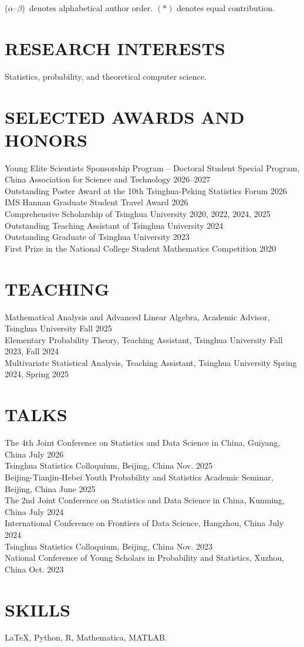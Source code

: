 \documentclass[a4paper,10pt]{extarticle}
\newcommand{\alphaorder}{($\alpha$--$\beta$)}
\begin{document}
\noindent
\alphaorder\ denotes alphabetical author order. $(*)$ denotes equal contribution.

\vfill
\section*{RESEARCH INTERESTS}
Statistics, probability, and theoretical computer science.

\vfill
\section*{SELECTED AWARDS AND HONORS}
Young Elite Scientists Sponsorship Program -- Doctoral Student Special Program,
China Association for Science and Technology \hfill 2026--2027\\
Outstanding Poster Award at the 10th Tsinghua-Peking Statistics Forum \hfill 2026\\
IMS Hannan Graduate Student Travel Award \hfill 2026\\
Comprehensive Scholarship of Tsinghua University \hfill 2020, 2022, 2024, 2025\\
Outstanding Teaching Assistant of Tsinghua University \hfill 2024\\
Outstanding Graduate of Tsinghua University \hfill 2023\\
First Prize in the National College Student Mathematics Competition \hfill 2020

\vfill
\section*{TEACHING}
Mathematical Analysis and Advanced Linear Algebra, Academic Advisor,
Tsinghua University \hfill Fall 2025\\
Elementary Probability Theory, Teaching Assistant,
Tsinghua University \hfill Fall 2023, Fall 2024\\
Multivariate Statistical Analysis, Teaching Assistant,
Tsinghua University \hfill Spring 2024, Spring 2025

\vfill
\section*{TALKS}
The 4th Joint Conference on Statistics and Data Science in China, Guiyang, China
\hfill July 2026\\
Tsinghua Statistics Colloquium, Beijing, China \hfill Nov. 2025\\
Beijing-Tianjin-Hebei Youth Probability and Statistics Academic Seminar, Beijing, China
\hfill June 2025\\
The 2nd Joint Conference on Statistics and Data Science in China, Kunming, China
\hfill July 2024\\
International Conference on Frontiers of Data Science, Hangzhou, China
\hfill July 2024\\
Tsinghua Statistics Colloquium, Beijing, China \hfill Nov. 2023\\
National Conference of Young Scholars in Probability and Statistics, Xuzhou, China
\hfill Oct. 2023

\vfill
\section*{SKILLS}
\LaTeX, Python, R, Mathematica, MATLAB.
\end{document}
